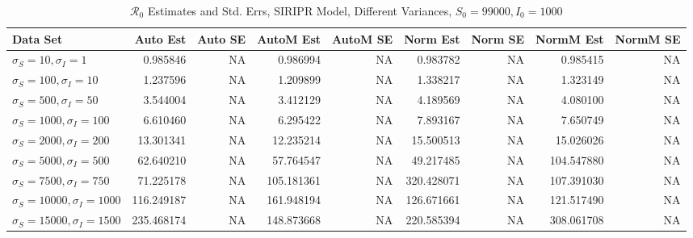 \documentclass[12pt]{article}
\newcommand{\rr}{\ensuremath{\mathcal{R}_0}}
\begin{document}
\begin{table}[H]
	
	\caption{$\rr$ Estimates and Std. Errs, SIRIPR Model,
		Different Variances, 
		$S_0 = 99000, I_0 = 1000$}
	\begin{footnotesize}
		\hskip -1.7cm
	\begin{tabular}{l|r|r|r|r|r|r|r|r}
		\hline
		Data Set & Auto Est & Auto SE & AutoM Est & AutoM SE & Norm Est & Norm SE & NormM Est & NormM SE\\
		\hline
		$\sigma_S = 10, \sigma_I = 1$ & 0.985846 & NA & 0.986994 & NA & 0.983782 & NA & 0.985415 & NA \\
		\hline
		$\sigma_S = 100, \sigma_I = 10$ & 1.237596 & NA & 1.209899 & NA & 1.338217 & NA & 1.323149 & NA\\
		\hline
		$\sigma_S = 500, \sigma_I = 50$ & 3.544004 & NA & 3.412129 & NA & 4.189569 & NA & 4.080100 & NA\\
		\hline
		$\sigma_S = 1000, \sigma_I = 100$ & 6.610460 & NA & 6.295422 & NA & 7.893167 & NA & 7.650749 & NA\\
		\hline
		$\sigma_S = 2000, \sigma_I = 200$ & 13.301341 & NA & 12.235214 & NA & 15.500513 & NA & 15.026026 & NA\\
		\hline
		$\sigma_S = 5000, \sigma_I = 500$ & 62.640210 & NA & 57.764547 & NA & 49.217485 & NA & 104.547880 & NA\\
		\hline
		$\sigma_S = 7500, \sigma_I = 750$ & 71.225178 & NA & 105.181361 & NA & 320.428071 & NA & 107.391030 & NA\\
		\hline
		$\sigma_S = 10000, \sigma_I = 1000$ & 116.249187 & NA & 161.948194 & NA & 126.671661 & NA & 121.517490 & NA \\
		\hline
		$\sigma_S = 15000, \sigma_I = 1500$ & 235.468174 & NA & 148.873668 & NA & 220.585394 & NA & 308.061708 & NA\\
		\hline
	\end{tabular}
\end{footnotesize}
\end{table}
\end{document}

